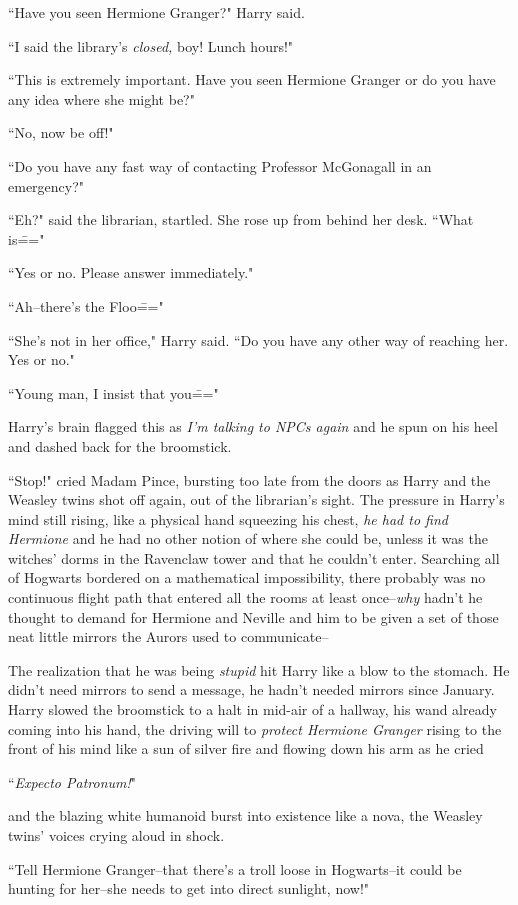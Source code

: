 ``Have you seen Hermione Granger?" Harry said.

``I said the library's \emph{closed,} boy! Lunch hours!"

``This is extremely important. Have you seen Hermione Granger or do you have any idea where she might be?"

``No, now be off!"

``Do you have any fast way of contacting Professor McGonagall in an emergency?"

``Eh?" said the librarian, startled. She rose up from behind her desk. ``What is\==="

``Yes or no. Please answer immediately."

``Ah\---there's the Floo\==="

``She's not in her office," Harry said. ``Do you have any other way of reaching her. Yes or no."

``Young man, I insist that you\==="

Harry's brain flagged this as \emph{I'm talking to NPCs again} and he spun on his heel and dashed back for the broomstick.

``Stop!" cried Madam Pince, bursting too late from the doors as Harry and the Weasley twins shot off again, out of the librarian's sight. The pressure in Harry's mind still rising, like a physical hand squeezing his chest, \emph{he had to find Hermione} and he had no other notion of where she could be, unless it was the witches' dorms in the Ravenclaw tower and that he couldn't enter. Searching all of Hogwarts bordered on a mathematical impossibility, there probably was no continuous flight path that entered all the rooms at least once\---\emph{why} hadn't he thought to demand for Hermione and Neville and him to be given a set of those neat little mirrors the Aurors used to communicate\---

The realization that he was being \emph{stupid} hit Harry like a blow to the stomach. He didn't need mirrors to send a message, he hadn't needed mirrors since January. Harry slowed the broomstick to a halt in mid-air of a hallway, his wand already coming into his hand, the driving will to \emph{protect Hermione Granger} rising to the front of his mind like a sun of silver fire and flowing down his arm as he cried

``\emph{Expecto Patronum!}"

and the blazing white humanoid burst into existence like a nova, the Weasley twins' voices crying aloud in shock.

``Tell Hermione Granger\---that there's a troll loose in Hogwarts\---it could be hunting for her\---she needs to get into direct sunlight, now!"

